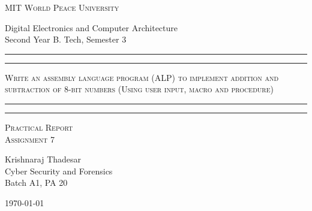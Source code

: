 \documentclass[11pt]{article}
\begin{document}
\begin{titlepage}
	\centering


	\huge\textsc{
		MIT World Peace University
	}\\

	\vspace{0.75\baselineskip} %

	\LARGE{
		Digital Electronics and Computer Architecture\\
		Second Year B. Tech, Semester 3
	}

	\vfill %


	\rule{\textwidth}{1.6pt}\vspace*{-\baselineskip}\vspace*{2pt}
	\rule{\textwidth}{0.6pt}
	\vspace{0.75\baselineskip} %



	\huge{\textsc{
		Write an assembly language program (ALP) to implement addition and subtraction of 8-bit numbers (Using user input, macro and procedure)
		}} \\



	\vspace{0.5\baselineskip} %
	\rule{\textwidth}{0.6pt}\vspace*{-\baselineskip}\vspace*{2.8pt}
	\rule{\textwidth}{1.6pt}

	\vspace{1\baselineskip} %


	\LARGE\textsc{
		Practical Report\\
		Assignment 7
	} %
	\vfill


	\vspace{0.5\baselineskip} %

	\Large{
		Krishnaraj Thadesar \\
		Cyber Security and Forensics\\
		Batch A1, PA 20
	}


	\vspace{0.5\baselineskip} %
	\today

\end{titlepage}
\end{document}
